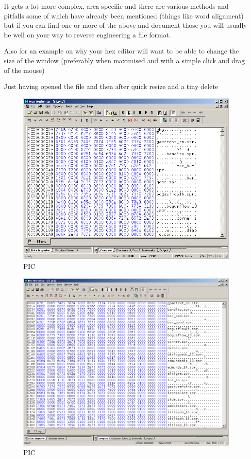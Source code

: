 \documentclass[
]{book}
\begin{document}
It gets a lot more complex, area specific and there are various methods and pitfalls some of which have already been mentioned (things like word alignment) but if you can find one or more of the above and document those you will usually be well on your way to reverse engineering a file format.

Also for an example on why your hex editor will want to be able to change the size of the window (preferably when maximised and with a simple click and drag of the mouse)

Just having opened the file and then after quick resize and a tiny delete

\begin{figure}
\centering
\includegraphics{images/18_home_fast6191_romhackingguide_unrenamed_file___borders_romhackingguidebasicfileformatshex1.png}
\caption{PIC}
\end{figure}

\begin{figure}
\centering
\includegraphics{images/19_home_fast6191_romhackingguide_unrenamed_file___borders_romhackingguidebasicfileformatshex2.png}
\caption{PIC}
\end{figure}
\end{document}

